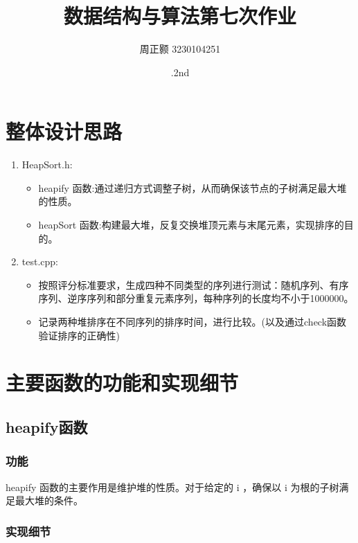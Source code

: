 \documentclass{article}
\title{数据结构与算法第七次作业}
\author{周正颢 3230104251}
\date{\Dec.2nd}
\begin{document}
\maketitle

\section{整体设计思路}

    \begin{enumerate}
        \item HeapSort.h:
        \begin{itemize}
            \item heapify 函数:通过递归方式调整子树，从而确保该节点的子树满足最大堆的性质。
            \item heapSort 函数:构建最大堆，反复交换堆顶元素与末尾元素，实现排序的目的。
        \end{itemize}
        \item test.cpp:
        \begin{itemize}
            \item 按照评分标准要求，生成四种不同类型的序列进行测试：随机序列、有序序列、逆序序列和部分重复元素序列，每种序列的长度均不小于1000000。
            \item 记录两种堆排序在不同序列的排序时间，进行比较。(以及通过check函数验证排序的正确性)
        \end{itemize}
    \end{enumerate}

    \section{主要函数的功能和实现细节}

    \subsection{heapify函数}

    \subsubsection{功能}

    heapify 函数的主要作用是维护堆的性质。对于给定的 i ，确保以 i 为根的子树满足最大堆的条件。

    \subsubsection{实现细节}
\end{document}
